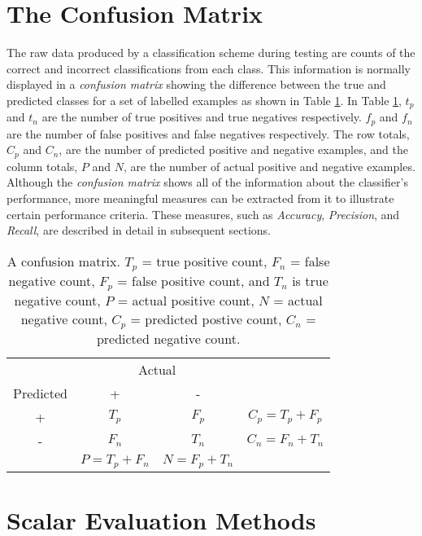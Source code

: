 \documentclass[12pt]{unbthesis}
\begin{document}
\section{The Confusion Matrix}
The raw data produced by a classification scheme during testing are
counts of the correct and incorrect classifications from each
class. This information is normally displayed in a \textit{confusion
  matrix} showing the difference between the true and predicted
classes for a set of labelled examples as shown in Table
\ref{tab:confusionmatrix}. In Table \ref{tab:confusionmatrix}, \(t_p\)
and \(t_n\) are the number of true positives and true negatives
respectively. \(f_p\) and \(f_n\) are the number of false positives
and false negatives respectively. The row totals, \(C_p\) and \(C_n\),
are the number of predicted positive and negative examples, and the
column totals, \(P\) and \(N\), are the number of actual positive
and negative examples. Although the \textit{confusion matrix} shows
all of the information about the classifier's performance, more
meaningful measures can be extracted from it to illustrate certain
performance criteria. These measures, such as \textit{Accuracy},
\textit{Precision}, and \textit{Recall}, are described in detail in
subsequent sections.

\begin{table}
\centering
  \begin{tabular}{c|c|c|c}
    & \multicolumn{2}{|c|}{Actual} \\ \cline{1-3}
    Predicted & + & - & \\ \hline
    + & \(T_p\)           & \(F_p\)           & \(C_p = T_p + F_p\)  \\ \hline
    - & \(F_n\)           & \(T_n\)           & \(C_n = F_n + T_n\)  \\ \hline
    & \(P = T_p + F_n\) & \(N = F_p + T_n\) \\ \cline{2-3}
  \end{tabular}
  \caption{A confusion matrix. \(T_p\) = true positive count, \(F_n\)
  = false negative count, \(F_p\) = false positive count, and \(T_n\)
  is true negative count, \(P\) = actual positive count, \(N\) = actual
  negative count, \(C_p\) = predicted postive count, \(C_n\) =
  predicted negative count.}
  \label{tab:confusionmatrix}
\end{table}


\section{Scalar Evaluation Methods}
\end{document}
